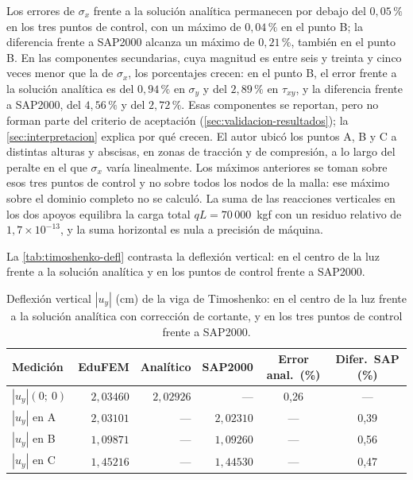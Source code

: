 Los errores de $\sigma_x$ frente a la solución analítica permanecen por debajo del $0{,}05\,\%$ en los tres puntos de control, con un máximo de $0{,}04\,\%$ en el punto B; la diferencia frente a SAP2000 alcanza un máximo de $0{,}21\,\%$, también en el punto B. En las componentes secundarias, cuya magnitud es entre seis y treinta y cinco veces menor que la de $\sigma_x$, los porcentajes crecen: en el punto B, el error frente a la solución analítica es del $0{,}94\,\%$ en $\sigma_y$ y del $2{,}89\,\%$ en $\tau_{xy}$, y la diferencia frente a SAP2000, del $4{,}56\,\%$ y del $2{,}72\,\%$. Esas componentes se reportan, pero no forman parte del criterio de aceptación (\autoref{sec:validacion-resultados}); la \autoref{sec:interpretacion} explica por qué crecen. El autor ubicó los puntos A, B y C a distintas alturas y abscisas, en zonas de tracción y de compresión, a lo largo del peralte en el que $\sigma_x$ varía linealmente. Los máximos anteriores se toman sobre esos tres puntos de control y no sobre todos los nodos de la malla: ese máximo sobre el dominio completo no se calculó. La suma de las reacciones verticales en los dos apoyos equilibra la carga total $qL = 70\,000$~kgf con un residuo relativo de $1{,}7\times10^{-13}$, y la suma horizontal es nula a precisión de máquina.

La \autoref{tab:timoshenko-defl} contrasta la deflexión vertical: en el centro de la luz frente a la solución analítica y en los puntos de control frente a SAP2000.

\begin{table}[htbp]
\centering
\caption[Deflexión vertical $|u_y|$ (cm): EduFEM frente a la solución analítica y a SAP2000.]{Deflexión vertical $|u_y|$ (cm) de la viga de Timoshenko: en el centro de la luz frente a la solución analítica con corrección de cortante, y en los tres puntos de control frente a SAP2000.}
\label{tab:timoshenko-defl}
\begin{tabular}{l r r r c c}
\hline
Medición & EduFEM & Analítico & SAP2000 & Error anal.\ (\%) & Difer.\ SAP (\%) \\
\hline
$|u_y|(0;\ 0)$ & $2{,}03460$ & $2{,}02926$ & ---         & 0,26 & --- \\
$|u_y|$ en A & $2{,}03101$ & ---         & $2{,}02310$ & ---    & 0,39 \\
$|u_y|$ en B & $1{,}09871$ & ---         & $1{,}09260$ & ---    & 0,56 \\
$|u_y|$ en C & $1{,}45216$ & ---         & $1{,}44530$ & ---    & 0,47 \\
\hline
\end{tabular}
\end{table}

